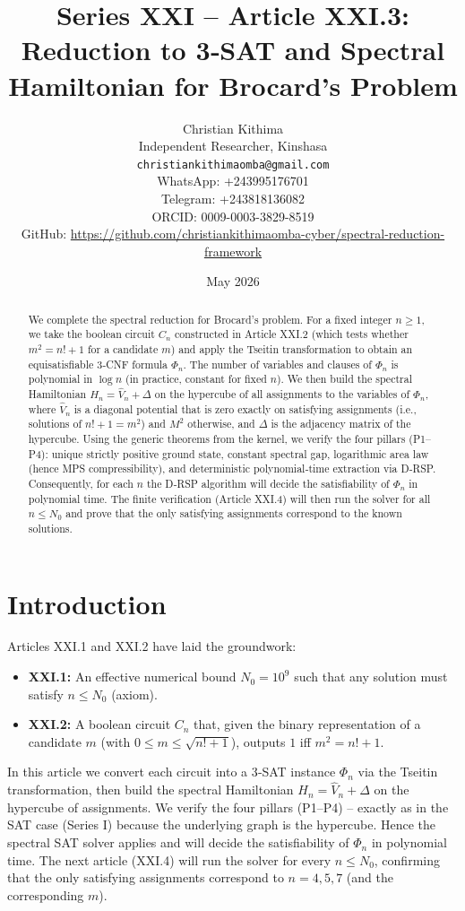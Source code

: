 \documentclass[11pt,a4paper]{article}
\title{Series XXI – Article XXI.3: Reduction to 3‑SAT and Spectral Hamiltonian for Brocard's Problem}
\author{Christian Kithima \\
Independent Researcher, Kinshasa \\
\texttt{christiankithimaomba@gmail.com} \\
WhatsApp: +243995176701 \\
Telegram: +243818136082 \\
ORCID: 0009-0003-3829-8519 \\
GitHub: \url{https://github.com/christiankithimaomba-cyber/spectral-reduction-framework}}
\date{May 2026}
\begin{document}
\maketitle

\begin{abstract}
We complete the spectral reduction for Brocard's problem. For a fixed integer $n\ge 1$, we take the boolean circuit $C_n$ constructed in Article XXI.2 (which tests whether $m^2 = n!+1$ for a candidate $m$) and apply the Tseitin transformation to obtain an equisatisfiable 3‑CNF formula $\Phi_n$. The number of variables and clauses of $\Phi_n$ is polynomial in $\log n$ (in practice, constant for fixed $n$). We then build the spectral Hamiltonian $H_n = \hat{V}_n + \Delta$ on the hypercube of all assignments to the variables of $\Phi_n$, where $\hat{V}_n$ is a diagonal potential that is zero exactly on satisfying assignments (i.e., solutions of $n!+1=m^2$) and $M^2$ otherwise, and $\Delta$ is the adjacency matrix of the hypercube. Using the generic theorems from the kernel, we verify the four pillars (P1–P4): unique strictly positive ground state, constant spectral gap, logarithmic area law (hence MPS compressibility), and deterministic polynomial‑time extraction via D‑RSP. Consequently, for each $n$ the D‑RSP algorithm will decide the satisfiability of $\Phi_n$ in polynomial time. The finite verification (Article XXI.4) will then run the solver for all $n\le N_0$ and prove that the only satisfying assignments correspond to the known solutions.
\end{abstract}

\tableofcontents

\section{Introduction}

Articles XXI.1 and XXI.2 have laid the groundwork:
\begin{itemize}
\item \textbf{XXI.1:} An effective numerical bound $N_0 = 10^9$ such that any solution must satisfy $n \le N_0$ (axiom).
\item \textbf{XXI.2:} A boolean circuit $C_n$ that, given the binary representation of a candidate $m$ (with $0\le m\le \sqrt{n!+1}$), outputs $1$ iff $m^2 = n!+1$.
\end{itemize}
In this article we convert each circuit into a 3‑SAT instance $\Phi_n$ via the Tseitin transformation, then build the spectral Hamiltonian $H_n = \hat{V}_n + \Delta$ on the hypercube of assignments. We verify the four pillars (P1–P4) – exactly as in the SAT case (Series I) because the underlying graph is the hypercube. Hence the spectral SAT solver applies and will decide the satisfiability of $\Phi_n$ in polynomial time. The next article (XXI.4) will run the solver for every $n\le N_0$, confirming that the only satisfying assignments correspond to $n=4,5,7$ (and the corresponding $m$).
\end{document}
